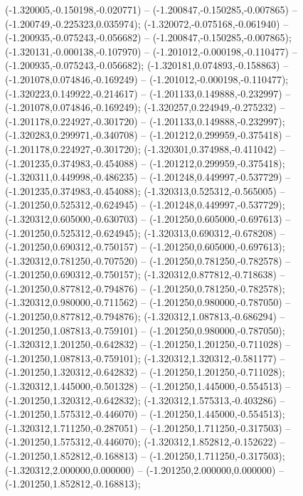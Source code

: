  (-1.320005,-0.150198,-0.020771) -- (-1.200847,-0.150285,-0.007865) -- (-1.200749,-0.225323,0.035974);
 (-1.320072,-0.075168,-0.061940) -- (-1.200935,-0.075243,-0.056682) -- (-1.200847,-0.150285,-0.007865);
 (-1.320131,-0.000138,-0.107970) -- (-1.201012,-0.000198,-0.110477) -- (-1.200935,-0.075243,-0.056682);
 (-1.320181,0.074893,-0.158863) -- (-1.201078,0.074846,-0.169249) -- (-1.201012,-0.000198,-0.110477);
 (-1.320223,0.149922,-0.214617) -- (-1.201133,0.149888,-0.232997) -- (-1.201078,0.074846,-0.169249);
 (-1.320257,0.224949,-0.275232) -- (-1.201178,0.224927,-0.301720) -- (-1.201133,0.149888,-0.232997);
 (-1.320283,0.299971,-0.340708) -- (-1.201212,0.299959,-0.375418) -- (-1.201178,0.224927,-0.301720);
 (-1.320301,0.374988,-0.411042) -- (-1.201235,0.374983,-0.454088) -- (-1.201212,0.299959,-0.375418);
 (-1.320311,0.449998,-0.486235) -- (-1.201248,0.449997,-0.537729) -- (-1.201235,0.374983,-0.454088);
 (-1.320313,0.525312,-0.565005) -- (-1.201250,0.525312,-0.624945) -- (-1.201248,0.449997,-0.537729);
 (-1.320312,0.605000,-0.630703) -- (-1.201250,0.605000,-0.697613) -- (-1.201250,0.525312,-0.624945);
 (-1.320313,0.690312,-0.678208) -- (-1.201250,0.690312,-0.750157) -- (-1.201250,0.605000,-0.697613);
 (-1.320312,0.781250,-0.707520) -- (-1.201250,0.781250,-0.782578) -- (-1.201250,0.690312,-0.750157);
 (-1.320312,0.877812,-0.718638) -- (-1.201250,0.877812,-0.794876) -- (-1.201250,0.781250,-0.782578);
 (-1.320312,0.980000,-0.711562) -- (-1.201250,0.980000,-0.787050) -- (-1.201250,0.877812,-0.794876);
 (-1.320312,1.087813,-0.686294) -- (-1.201250,1.087813,-0.759101) -- (-1.201250,0.980000,-0.787050);
 (-1.320312,1.201250,-0.642832) -- (-1.201250,1.201250,-0.711028) -- (-1.201250,1.087813,-0.759101);
 (-1.320312,1.320312,-0.581177) -- (-1.201250,1.320312,-0.642832) -- (-1.201250,1.201250,-0.711028);
 (-1.320312,1.445000,-0.501328) -- (-1.201250,1.445000,-0.554513) -- (-1.201250,1.320312,-0.642832);
 (-1.320312,1.575313,-0.403286) -- (-1.201250,1.575312,-0.446070) -- (-1.201250,1.445000,-0.554513);
 (-1.320312,1.711250,-0.287051) -- (-1.201250,1.711250,-0.317503) -- (-1.201250,1.575312,-0.446070);
 (-1.320312,1.852812,-0.152622) -- (-1.201250,1.852812,-0.168813) -- (-1.201250,1.711250,-0.317503);
 (-1.320312,2.000000,0.000000) -- (-1.201250,2.000000,0.000000) -- (-1.201250,1.852812,-0.168813);
